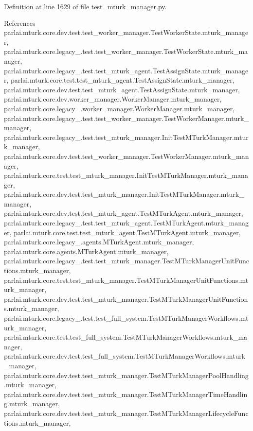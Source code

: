 Definition at line 1629 of file test\+\_\+mturk\+\_\+manager.\+py.



References parlai.\+mturk.\+core.\+dev.\+test.\+test\+\_\+worker\+\_\+manager.\+Test\+Worker\+State.\+mturk\+\_\+manager, parlai.\+mturk.\+core.\+legacy\+\_.\+test.\+test\+\_\+worker\+\_\+manager.\+Test\+Worker\+State.\+mturk\+\_\+manager, parlai.\+mturk.\+core.\+legacy\+\_.\+test.\+test\+\_\+mturk\+\_\+agent.\+Test\+Assign\+State.\+mturk\+\_\+manager, parlai.\+mturk.\+core.\+test.\+test\+\_\+mturk\+\_\+agent.\+Test\+Assign\+State.\+mturk\+\_\+manager, parlai.\+mturk.\+core.\+dev.\+test.\+test\+\_\+mturk\+\_\+agent.\+Test\+Assign\+State.\+mturk\+\_\+manager, parlai.\+mturk.\+core.\+dev.\+worker\+\_\+manager.\+Worker\+Manager.\+mturk\+\_\+manager, parlai.\+mturk.\+core.\+legacy\+\_.\+worker\+\_\+manager.\+Worker\+Manager.\+mturk\+\_\+manager, parlai.\+mturk.\+core.\+legacy\+\_.\+test.\+test\+\_\+worker\+\_\+manager.\+Test\+Worker\+Manager.\+mturk\+\_\+manager, parlai.\+mturk.\+core.\+legacy\+\_.\+test.\+test\+\_\+mturk\+\_\+manager.\+Init\+Test\+M\+Turk\+Manager.\+mturk\+\_\+manager, parlai.\+mturk.\+core.\+dev.\+test.\+test\+\_\+worker\+\_\+manager.\+Test\+Worker\+Manager.\+mturk\+\_\+manager, parlai.\+mturk.\+core.\+test.\+test\+\_\+mturk\+\_\+manager.\+Init\+Test\+M\+Turk\+Manager.\+mturk\+\_\+manager, parlai.\+mturk.\+core.\+dev.\+test.\+test\+\_\+mturk\+\_\+manager.\+Init\+Test\+M\+Turk\+Manager.\+mturk\+\_\+manager, parlai.\+mturk.\+core.\+dev.\+test.\+test\+\_\+mturk\+\_\+agent.\+Test\+M\+Turk\+Agent.\+mturk\+\_\+manager, parlai.\+mturk.\+core.\+legacy\+\_.\+test.\+test\+\_\+mturk\+\_\+agent.\+Test\+M\+Turk\+Agent.\+mturk\+\_\+manager, parlai.\+mturk.\+core.\+test.\+test\+\_\+mturk\+\_\+agent.\+Test\+M\+Turk\+Agent.\+mturk\+\_\+manager, parlai.\+mturk.\+core.\+legacy\+\_.\+agents.\+M\+Turk\+Agent.\+mturk\+\_\+manager, parlai.\+mturk.\+core.\+agents.\+M\+Turk\+Agent.\+mturk\+\_\+manager, parlai.\+mturk.\+core.\+legacy\+\_.\+test.\+test\+\_\+mturk\+\_\+manager.\+Test\+M\+Turk\+Manager\+Unit\+Functions.\+mturk\+\_\+manager, parlai.\+mturk.\+core.\+test.\+test\+\_\+mturk\+\_\+manager.\+Test\+M\+Turk\+Manager\+Unit\+Functions.\+mturk\+\_\+manager, parlai.\+mturk.\+core.\+dev.\+test.\+test\+\_\+mturk\+\_\+manager.\+Test\+M\+Turk\+Manager\+Unit\+Functions.\+mturk\+\_\+manager, parlai.\+mturk.\+core.\+legacy\+\_.\+test.\+test\+\_\+full\+\_\+system.\+Test\+M\+Turk\+Manager\+Workflows.\+mturk\+\_\+manager, parlai.\+mturk.\+core.\+test.\+test\+\_\+full\+\_\+system.\+Test\+M\+Turk\+Manager\+Workflows.\+mturk\+\_\+manager, parlai.\+mturk.\+core.\+dev.\+test.\+test\+\_\+full\+\_\+system.\+Test\+M\+Turk\+Manager\+Workflows.\+mturk\+\_\+manager, parlai.\+mturk.\+core.\+dev.\+test.\+test\+\_\+mturk\+\_\+manager.\+Test\+M\+Turk\+Manager\+Pool\+Handling.\+mturk\+\_\+manager, parlai.\+mturk.\+core.\+dev.\+test.\+test\+\_\+mturk\+\_\+manager.\+Test\+M\+Turk\+Manager\+Time\+Handling.\+mturk\+\_\+manager, parlai.\+mturk.\+core.\+dev.\+test.\+test\+\_\+mturk\+\_\+manager.\+Test\+M\+Turk\+Manager\+Lifecycle\+Functions.\+mturk\+\_\+manager, 